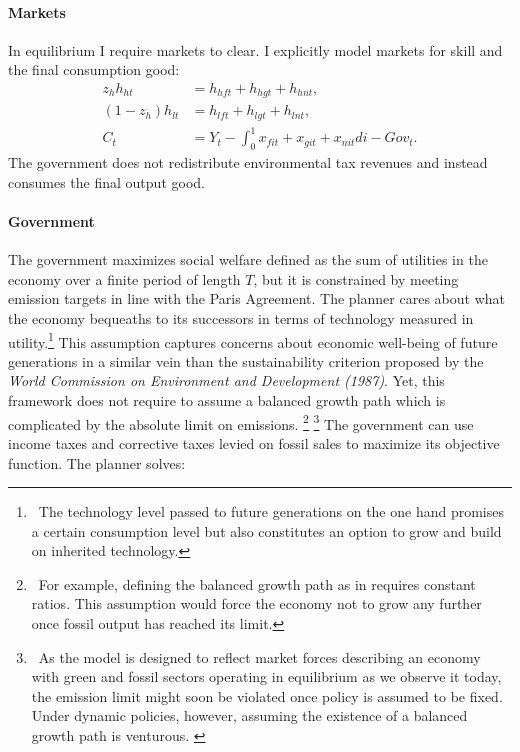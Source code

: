\paragraph{Markets}
In equilibrium I require markets to clear. I explicitly model markets for skill and the final consumption good:
\begin{align}
z_h h_{ht}&=h_{hft}+h_{hgt}+h_{hnt},\\
(1-z_h) h_{lt}&=h_{lft}+h_{lgt}+h_{lnt},\\
C_t&=Y_t-\int_{0}^{1}x_{fit}+x_{git}+x_{nit}di-Gov_t.
\end{align}
The government does not redistribute environmental tax revenues and instead consumes the final output good. 
\paragraph{Government}

The government maximizes social welfare defined as the sum of utilities in the economy over a finite period of length $T$, but it is constrained by meeting emission targets in line with the Paris Agreement. 
The planner cares about what the economy bequeaths to its successors in terms of technology measured in utility.\footnote{\ The technology level passed to future generations on the one hand promises a certain consumption level but also constitutes an option to grow and build on inherited technology.} This assumption captures concerns about economic well-being of future generations in a similar vein than the sustainability criterion proposed by the \textit{World Commission on Environment and Development (1987)}. Yet, this framework does not require to assume a balanced growth path which is complicated by the absolute limit on emissions. \footnote{\  For example, defining the balanced growth path as in \cite{Fried2018ClimateAnalysis} requires constant ratios. This assumption would force the economy not to grow any further once fossil output has reached its limit. } \footnote{\ As the model is designed to reflect market forces describing an economy with green and fossil sectors operating in equilibrium as we observe it today, the emission limit might soon be violated once policy is assumed to be fixed. Under dynamic policies, however, assuming the existence of a balanced growth path is venturous. \textit{} }
The government can use income taxes and corrective taxes levied on fossil sales to maximize its objective function. 
The planner solves:

